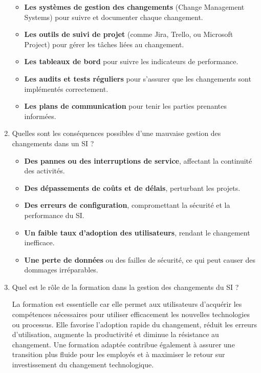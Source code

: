 \begin{enumerate}
        \begin{itemize}
            \item \textbf{Les systèmes de gestion des changements} (Change Management Systems) pour suivre et documenter chaque changement.
            \item \textbf{Les outils de suivi de projet} (comme Jira, Trello, ou Microsoft Project) pour gérer les tâches liées au changement.
            \item \textbf{Les tableaux de bord} pour suivre les indicateurs de performance.
            \item \textbf{Les audits et tests réguliers} pour s'assurer que les changements sont implémentés correctement.
            \item \textbf{Les plans de communication} pour tenir les parties prenantes informées.
        \end{itemize}
    \item Quelles sont les conséquences possibles d'une mauvaise gestion des changements dans un SI ?

        \begin{itemize}
            \item \textbf{Des pannes ou des interruptions de service}, affectant la continuité des activités.
            \item \textbf{Des dépassements de coûts et de délais}, perturbant les projets.
            \item \textbf{Des erreurs de configuration}, compromettant la sécurité et la performance du SI.
            \item \textbf{Un faible taux d'adoption des utilisateurs}, rendant le changement inefficace.
            \item \textbf{Une perte de données} ou des failles de sécurité, ce qui peut causer des dommages irréparables.
        \end{itemize}
    \item Quel est le rôle de la formation dans la gestion des changements du SI ?

        La formation est essentielle car elle permet aux utilisateurs d’acquérir les compétences nécessaires pour utiliser efficacement les nouvelles technologies ou processus. Elle favorise l’adoption rapide du changement, réduit les erreurs d’utilisation, augmente la productivité et diminue la résistance au changement. Une formation adaptée contribue également à assurer une transition plus fluide pour les employés et à maximiser le retour sur investissement du changement technologique.
\end{enumerate}
